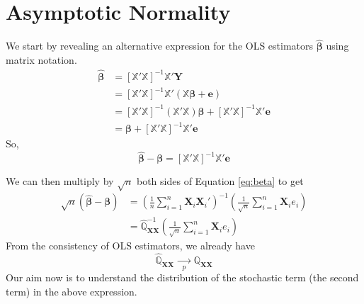 \documentclass[
]{book}
\theoremstyle{definition}
\theoremstyle{definition}
\theoremstyle{definition}
\theoremstyle{definition}
\theoremstyle{remark}
\begin{document}
\hypertarget{asymptotic-normality}{%
\section{Asymptotic Normality}\label{asymptotic-normality}}

We start by revealing an alternative expression for the OLS estimators \(\widehat{\pmb{\beta}}\) using matrix notation.
\begin{align}
\widehat{\pmb{\beta}}
&=\left[\mathbb{X}'\mathbb{X}\right]^{-1}\mathbb{X}'\pmb{Y} \\
&=\left[\mathbb{X}'\mathbb{X}\right]^{-1}\mathbb{X}'(\mathbb{X}\pmb{\beta}+\pmb{e}) \\
&=\left[\mathbb{X}'\mathbb{X}\right]^{-1}(\mathbb{X}'\mathbb{X})\pmb{\beta}+
\left[\mathbb{X}'\mathbb{X}\right]^{-1}\mathbb{X}'\pmb{e} \\
&=\pmb{\beta} + \left[\mathbb{X}'\mathbb{X}\right]^{-1}\mathbb{X}'\pmb{e}
\end{align}
So,
\begin{equation}
\widehat{\pmb{\beta}}-\pmb{\beta} = \left[\mathbb{X}'\mathbb{X}\right]^{-1}\mathbb{X}'\pmb{e}
\label{eq:beta}
\end{equation}

We can then multiply by \(\sqrt{n}\) both sides of Equation \eqref{eq:beta} to get
\begin{align}
\sqrt{n}\left(\widehat{\pmb{\beta}}-\pmb{\beta}\right)
&=\left( \frac{1}{n}\sum\limits_{i=1}^n\pmb{X}_i\pmb{X}_i' \right)^{-1}
\left( \frac{1}{\sqrt{n}}\sum\limits_{i=1}^n\pmb{X}_ie_i \right) \\
&=\widehat{\mathbb Q}_{\pmb{XX}}^{-1}
\left( \frac{1}{\sqrt{n}}\sum\limits_{i=1}^n\pmb{X}_ie_i \right)
\end{align}
From the consistency of OLS estimators, we already have
\[ \widehat{\mathbb Q}_{\pmb{XX}}\xrightarrow[p]{\quad\quad}\mathbb{Q}_{\pmb{XX}}\]
Our aim now is to understand the distribution of the stochastic term (the second term) in the above expression.
\end{document}
